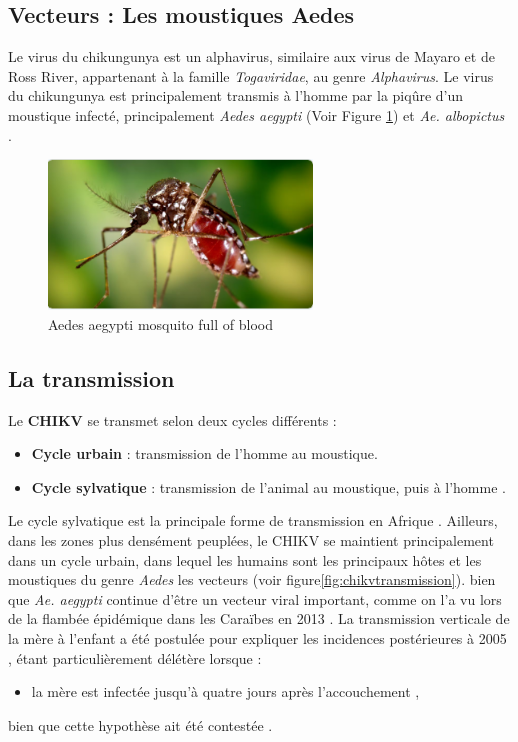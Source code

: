 \subsection{Vecteurs : Les moustiques Aedes}
Le virus du chikungunya est un alphavirus, similaire aux virus de Mayaro et de Ross River, appartenant à la famille \textit{Togaviridae}, au genre \textit{Alphavirus}. Le virus du chikungunya est principalement transmis à l'homme par la piqûre d'un moustique infecté, principalement \textit{Aedes aegypti} (Voir Figure \ref{fig:aedes}) et \textit{Ae. albopictus} .
\begin{figure}[!h]
	\begin{center}
		\includegraphics[width=7cm]{images/moustique}
	\end{center}
	\caption{Aedes aegypti mosquito full of blood}
	\label{fig:aedes}
\end{figure} 

\subsection{La transmission}
Le \textbf{CHIKV} se transmet selon deux cycles différents :
\begin{itemize}
	\item \textbf{Cycle urbain} : transmission de l'homme au moustique.
	\item \textbf{Cycle sylvatique} : transmission de l'animal au moustique, puis à l'homme \cite{ganesan2017chikungunya}.
\end{itemize}
Le cycle sylvatique est la principale forme de transmission en Afrique \cite{ganesan2017chikungunya}. Ailleurs, dans les zones plus densément peuplées, le CHIKV se maintient principalement dans un cycle urbain, dans lequel les humains sont les principaux hôtes et les moustiques du genre \textit{Aedes} les vecteurs \cite{ganesan2017chikungunya} (voir figure\ref{fig:chikvtransmission}).
bien que \textit{Ae. aegypti} continue d'être un vecteur viral important, comme on l'a vu lors de la flambée épidémique dans les Caraïbes en 2013 \cite{ganesan2017chikungunya}.
La transmission verticale de la mère à l'enfant a été postulée pour expliquer les incidences postérieures à 2005 \cite{ganesan2017chikungunya}, étant particulièrement délétère lorsque :
\begin{itemize}
	\item la mère est infectée jusqu'à quatre jours après l'accouchement \cite{ganesan2017chikungunya},
\end{itemize}
bien que cette hypothèse ait été contestée \cite{ganesan2017chikungunya}.

